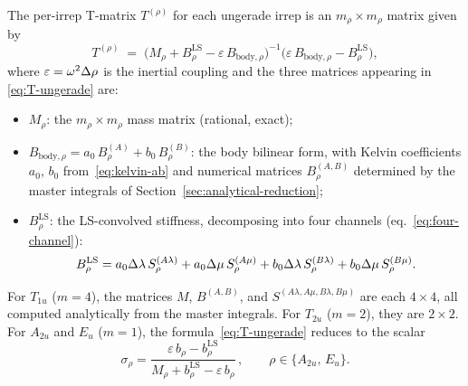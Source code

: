 The per-irrep T-matrix $T^{(\rho)}$ for each ungerade irrep is an
$m_\rho \times m_\rho$ matrix given by
\begin{equation}
  \boxed{\;T^{(\rho)}
  \;=\; \bigl(M_\rho + B^{\mathrm{LS}}_\rho
    - \varepsilon\,B_{\mathrm{body},\rho}\bigr)^{-1}
    \bigl(\varepsilon\,B_{\mathrm{body},\rho}
    - B^{\mathrm{LS}}_\rho\bigr),\;}
  \label{eq:T-ungerade}
\end{equation}
where $\varepsilon = \omega^2\Delta\rho$ is the inertial coupling and the
three matrices appearing in \eqref{eq:T-ungerade} are:
\begin{itemize}
\item $M_\rho$: the $m_\rho \times m_\rho$ mass matrix (rational,
  exact);
\item $B_{\mathrm{body},\rho} = a_0\,B^{(A)}_\rho + b_0\,B^{(B)}_\rho$:
  the body bilinear form, with Kelvin coefficients $a_0$, $b_0$
  from~\eqref{eq:kelvin-ab} and numerical matrices $B^{(A,B)}_\rho$
  determined by the master integrals of
  Section~\ref{sec:analytical-reduction};
\item $B^{\mathrm{LS}}_\rho$: the LS-convolved stiffness, decomposing
  into four channels (eq.~\eqref{eq:four-channel}):
  \begin{equation}
    B^{\mathrm{LS}}_\rho
    = a_0\Delta\lambda\,S^{(A\lambda)}_\rho
    + a_0\Delta\mu\,S^{(A\mu)}_\rho
    + b_0\Delta\lambda\,S^{(B\lambda)}_\rho
    + b_0\Delta\mu\,S^{(B\mu)}_\rho.
    \label{eq:BLS-four-channel}
  \end{equation}
\end{itemize}
For $T_{1u}$ ($m = 4$), the matrices $M$, $B^{(A,B)}$, and
$S^{(A\lambda,A\mu,B\lambda,B\mu)}$ are each $4 \times 4$, all
computed analytically from the master integrals.  For $T_{2u}$
($m = 2$), they are $2 \times 2$.  For $A_{2u}$ and $E_u$ ($m = 1$),
the formula~\eqref{eq:T-ungerade} reduces to the scalar
\begin{equation}
  \sigma_\rho
  = \frac{\varepsilon\,b_\rho - b^{\mathrm{LS}}_\rho}
         {M_\rho + b^{\mathrm{LS}}_\rho - \varepsilon\,b_\rho}\,,
  \qquad \rho \in \{A_{2u},\,E_u\}.
  \label{eq:T-ungerade-scalar}
\end{equation}

